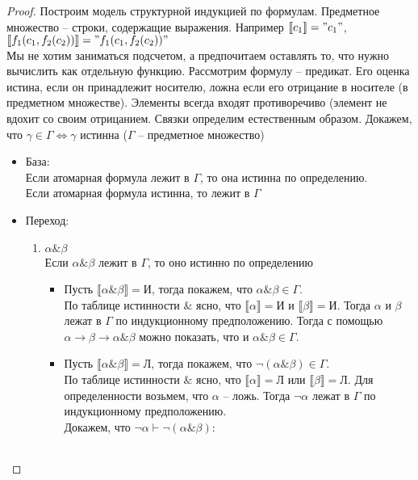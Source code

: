 \begin{proof}
Построим модель структурной индукцией по формулам. Предметное множество -- строки, содержащие выражения. Например $\llbracket c_1 \rrbracket = "c_1"$,
$\llbracket f_1 (c_1, f_2(c_2)) \rrbracket = " f_1 (c_1, f_2(c_2)) "$\\
Мы не хотим заниматься подсчетом, а предпочитаем оставлять то, что нужно вычислить как отдельную функцию. Рассмотрим формулу -- предикат. Его оценка истина, если он принадлежит носителю, ложна если его отрицание в носителе (в предметном множестве). Элементы всегда входят противоречиво (элемент не вдохит со своим отрицанием. Связки определим естественным образом. Докажем, что $\gamma \in \Gamma \Leftrightarrow \gamma$ истинна ($\Gamma$ -- предметное множество)
\begin{itemize}
\item База:\\
Если атомарная формула лежит в $\Gamma$, то она истинна по определению.\\
Если атомарная формула истинна, то лежит в $\Gamma$
\item Переход:
\begin{enumerate}
\item $\alpha \& \beta$\\
Если $\alpha \& \beta$ лежит в $\Gamma$, то оно истинно по определению\\
\begin{itemize}
\item Пусть $\llbracket \alpha \& \beta \rrbracket = \texttt{И}$, тогда покажем, что $\alpha \& \beta \in \Gamma$.\\
По таблице истинности $\&$ ясно, что $\llbracket \alpha \rrbracket = \texttt{И}$ и $\llbracket \beta \rrbracket = \texttt{И}$. Тогда $\alpha$ и $\beta$ лежат в $\Gamma$ по индукционному предположению. Тогда с помощью $\alpha \to \beta \to \alpha \& \beta$ можно показать, что и $\alpha \& \beta \in \Gamma$.
\item Пусть $\llbracket \alpha \& \beta \rrbracket = \texttt{Л}$, тогда покажем, что $\neg(\alpha \& \beta) \in \Gamma$.\\
По таблице истинности $\&$ ясно, что $\llbracket \alpha \rrbracket = \texttt{Л}$ или $\llbracket \beta \rrbracket = \texttt{Л}$. Для определенности возьмем, что $\alpha$ -- ложь. Тогда $\neg \alpha$ лежат в $\Gamma$ по индукционному предположению.\\
Докажем, что $\neg \alpha \vdash \neg (\alpha \& \beta)$:\\
\begin{tabular}{lll}

\end{tabular}
\end{itemize}
\end{enumerate}
\end{itemize}
\end{proof}
